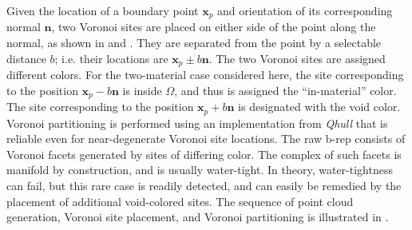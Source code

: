Given the location of a boundary point $\bm{x}_p$ and orientation of its corresponding normal $\bm{n}$, two Voronoi sites are placed on either side of the point along the normal, as shown in  and . They are separated from the point by a selectable distance $b$; i.e. their locations are $\bm{x}_p \pm b \bm{n}$. The two Voronoi sites are assigned different colors. For the two-material case considered here, the site corresponding to the position $\bm{x}_p - b\bm{n}$ is inside $\Omega$, and thus is assigned the ``in-material'' color.  The site corresponding to the position $\bm{x}_p + b\bm{n}$ is designated with the void color.  Voronoi partitioning is performed using an implementation from \textit{Qhull} \cite{barber_1996} that is reliable even for near-degenerate Voronoi site locations.  The raw b-rep consists of Voronoi facets generated by sites of differing color.  The complex of such facets is manifold by construction, and is usually water-tight.  In theory, water-tightness can fail, but this rare case is readily detected, and can easily be remedied by the placement of additional void-colored sites.  The sequence of point cloud generation, Voronoi site placement, and Voronoi partitioning is illustrated in .


